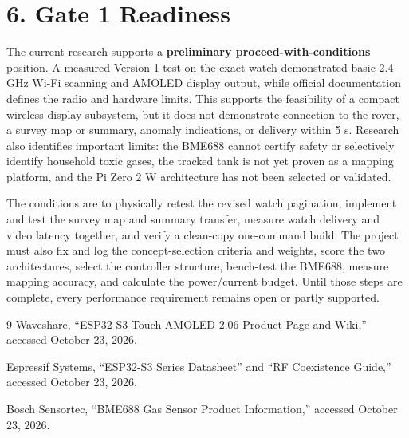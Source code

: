 \documentclass[10pt,letterpaper]{article}
\begin{document}
\section*{6. Gate 1 Readiness}

The current research supports a \textbf{preliminary proceed-with-conditions} position. A measured Version 1 test on the exact watch demonstrated basic 2.4 GHz Wi-Fi scanning and AMOLED display output, while official documentation defines the radio and hardware limits. This supports the feasibility of a compact wireless display subsystem, but it does not demonstrate connection to the rover, a survey map or summary, anomaly indications, or delivery within 5 s. Research also identifies important limits: the BME688 cannot certify safety or selectively identify household toxic gases, the tracked tank is not yet proven as a mapping platform, and the Pi Zero 2 W architecture has not been selected or validated.

The conditions are to physically retest the revised watch pagination, implement and test the survey map and summary transfer, measure watch delivery and video latency together, and verify a clean-copy one-command build. The project must also fix and log the concept-selection criteria and weights, score the two architectures, select the controller structure, bench-test the BME688, measure mapping accuracy, and calculate the power/current budget. Until those steps are complete, every performance requirement remains open or partly supported.

\begin{thebibliography}{9}
\small
{}
Waveshare, ``ESP32-S3-Touch-AMOLED-2.06 Product Page and Wiki,'' accessed October 23, 2026.

Espressif Systems, ``ESP32-S3 Series Datasheet'' and ``RF Coexistence Guide,'' accessed October 23, 2026.

Bosch Sensortec, ``BME688 Gas Sensor Product Information,'' accessed October 23, 2026.
\end{thebibliography}
\end{document}
